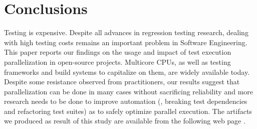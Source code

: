 \section{Conclusions}

Testing is expensive.  Despite all advances in regression testing
research, dealing with high testing costs remains an important problem
in Software Engineering.  This paper reports our findings on the usage
and impact of test execution parallelization in open-source projects.
Multicore CPUs, as well as testing frameworks and build systems to
capitalize on them, are widely available today.  Despite some
resistance observed from practitioners, our results suggest that
parallelization can be done in many cases without sacrificing
reliability and more research needs to be done to improve automation
(\eg{}, breaking test dependencies and refactoring test suites) as to
safely optimize parallel execution.  The artifacts we produced as
result of this study are available from the following web
page \webpage{}.







